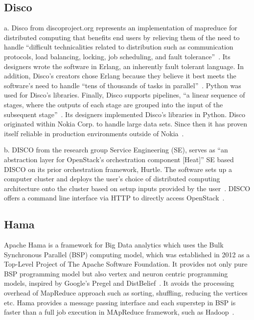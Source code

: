      \pv

     
\subsection{Disco}

a. Disco from discoproject.org represents an implementation of
mapreduce for distributed computing that benefits end users by
relieving them of the need to handle ``difficult technicalities
related to distribution such as communication protocols, load
balancing, locking, job scheduling, and fault
tolerance''~\cite{www-whatis-discoproject}. Its designers wrote the
software in Erlang, an inherently fault tolerant language. In
addition, Disco's creators chose Erlang because they believe it best
meets the software's need to handle ``tens of thousands of tasks in
parallel''~\cite{www-erlangprime-discoproject}. Python was used for
Disco's libraries. Finally, Disco supports pipelines, ``a linear
sequence of stages, where the outputs of each stage are grouped into
the input of the subsequent
stage''~\cite{www-clarridge-discoproject}. Its designers implemented
Disco's libraries in Python. Disco originated within Nokia Corp. to
handle large data sets.  Since then it has proven itself reliable in
production environments outside of
Nokia~\cite{www-nokia-discoproject}.

b. DISCO from the research group Service Engineering (SE), serves as
``an abstraction layer for OpenStack's orchestration component
[Heat]'' SE based DISCO on its prior orchestration framework,
Hurtle. The software sets up a computer cluster and deploys the user's
choice of distributed computing architecture onto the cluster based on
setup inputs provided by the
user~\cite{www-discoabout-discoabstractionlayer}.  DISCO offers a
command line interface via HTTP to directly access
OpenStack~\cite{www-discodescribed-discoabstractionlayer}.

     \pv

\subsection{Hama}

Apache Hama is a framework for Big Data analytics which uses the Bulk
Synchronous Parallel (BSP) computing model, which was established in
2012 as a Top-Level Project of The Apache Software Foundation. It
provides not only pure BSP programming model but also vertex and
neuron centric programming models, inspired by Google's Pregel and
DistBelief~\cite{apache-hama}. It avoids the processing overhead of
MapReduce approach such as sorting, shuffling, reducing the vertices
etc. Hama provides a message passing interface and each superstep in
BSP is faster than a full job execution in MApReduce framework, such
as Hadoop~\cite{book-hama}.
     
